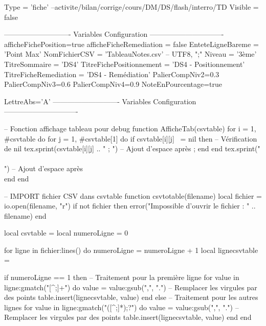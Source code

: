 \documentclass{classe-tex3R}
\begin{document}
\begin{luacode}
  Type = 'fiche' --activite/bilan/corrige/cours/DM/DS/flash/interro/TD
  Visible = false
\end{luacode}
\parametrage


\begin{luacode*}
----------------------------   Variables  Configuration -------------------------------
afficheFichePosition=true
afficheFicheRemediation  = false
EnteteLigneBareme = 'Point Max'
NomFichierCSV = 'TableauNotes.csv' -- UTF8, ";"
Niveau = '3ème'
TitreSommaire = 'DS4'
TitreFichePositionnement = 'DS4 - Positionnement'
TitreFicheRemediation = 'DS4 - Remédiation'
PalierCompNiv2=0.3
PalierCompNiv3=0.6
PalierCompNiv4=0.9
NoteEnPourcentage=true

LettreAbs='A'
----------------------------   Variables  Configuration -------------------------------



 -- Fonction affichage tableau pour debug
function AfficheTab(csvtable)
  for i = 1, #csvtable do
    for j = 1, #csvtable[1] do 
      if csvtable[i][j] ~= nil then  -- Vérification de nil
        tex.sprint(csvtable[i][j] .. " ; ")  -- Ajout d'espace après ;
      end
    end
    tex.sprint("\\\\ ")  -- Ajout d'espace après \\
  end
end


-- IMPORT fichier CSV dans csvtable
function csvtotable(filename)
    local fichier = io.open(filename, "r")
    if not fichier then
        error("Impossible d'ouvrir le fichier : " .. filename)
    end

    local csvtable = {}
    local numeroLigne = 0

    for ligne in fichier:lines() do
        numeroLigne = numeroLigne + 1
        local lignecsvtable = {}

        if numeroLigne == 1 then
            -- Traitement pour la première ligne
            for value in ligne:gmatch("[^;]+") do
                value = value:gsub(",", ".")  -- Remplacer les virgules par des points
                table.insert(lignecsvtable, value)
            end
        else
            -- Traitement pour les autres lignes
            for value in ligne:gmatch("([^;]*);?") do
                value = value:gsub(",", ".")  -- Remplacer les virgules par des points
                table.insert(lignecsvtable, value)
            end
        end


\end{luacode*}
\end{document}
